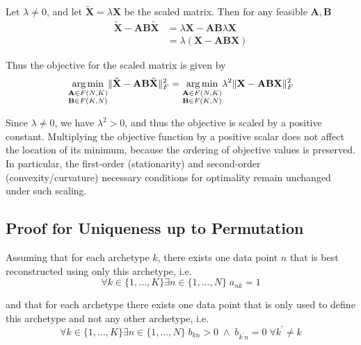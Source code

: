 \documentclass{article}
\DeclareMathOperator*{\argmin}{arg\,min}
\begin{document}
Let $\lambda \neq 0$, and let $\tilde{\mathbf{X}} = \lambda \mathbf{X}$ be the scaled matrix. Then for any feasible $\mathbf{A}, \mathbf{B}$
\begin{equation}
    \begin{aligned}
    \tilde{\mathbf{X}} - \mathbf{A} \mathbf{B} \tilde{\mathbf{X}}
    &= \lambda \mathbf{X} - \mathbf{A} \mathbf{B} \lambda \mathbf{X} \\
    &= \lambda \left( \mathbf{X} - \mathbf{A} \mathbf{B} \mathbf{X} \right)
    \end{aligned}
\end{equation}

Thus the objective for the scaled matrix is given by
\begin{equation}
    \underset{\begin{subarray}{c} \mathbf{A} \in F(N, K) \\ \mathbf{B} \in F(K, N) \end{subarray}}{\argmin} \| \tilde{\mathbf{X}} - \mathbf{A} \mathbf{B} \tilde{\mathbf{X}} \|_F^2 = \underset{\begin{subarray}{c} \mathbf{A} \in F(N, K) \\ \mathbf{B} \in F(K, N) \end{subarray}}{\argmin} \lambda^2 \| \mathbf{X} - \mathbf{A} \mathbf{B} \mathbf{X} \|_F^2
\end{equation}

Since $\lambda \neq 0$, we have $\lambda^2 > 0$, and thus the objective is scaled by a positive constant. Multiplying the objective function by a positive scalar does not affect the location of its minimum, because the ordering of objective values is preserved. In particular, the first-order (stationarity) and second-order (convexity/curvature) necessary conditions for optimality remain unchanged under such scaling.

\subsection{Proof for Uniqueness up to Permutation}
\label{subsec:uniqueness}

Assuming that for each archetype $k$, there exists one data point $n$ that is best reconstructed using only this archetype, i.e.
\begin{equation}
    \label{eq:cond1_}
    \forall k \in \{1, ..., K\} \exists n \in \{1, ..., N\} \; a_{n k} = 1
\end{equation}

and that for each archetype there exists one data point that is only used to define this archetype and not any other archetype, i.e.
\begin{equation}
    \label{eq:cond2_}
    \forall k \in \{1, ..., K\} \exists n \in \{1, ..., N\} \; b_{k n} > 0 \; \land \; b_{k^\prime n} = 0 \; \forall k^\prime \neq k
\end{equation}
\end{document}
